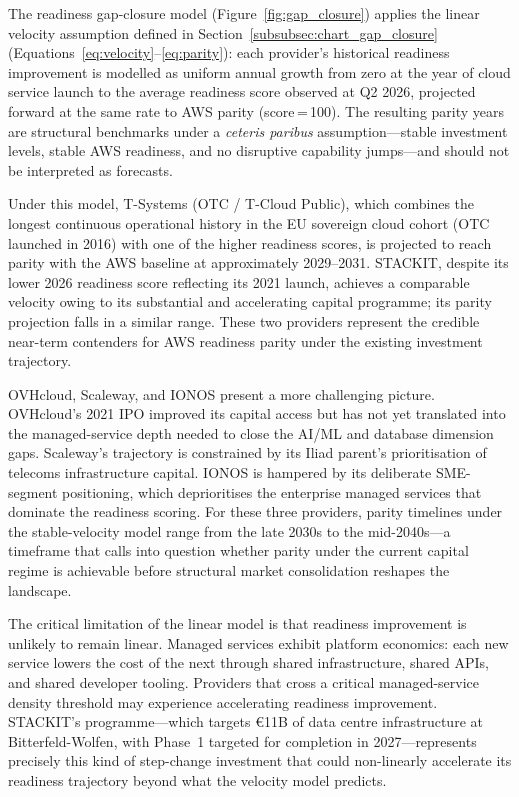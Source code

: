The readiness gap-closure model (Figure~\ref{fig:gap_closure}) applies the linear velocity assumption defined in Section~\ref{subsubsec:chart_gap_closure} (Equations~\ref{eq:velocity}--\ref{eq:parity}): each provider's historical readiness improvement is modelled as uniform annual growth from zero at the year of cloud service launch to the average readiness score observed at Q2 2026, projected forward at the same rate to AWS parity (score\,=\,100). The resulting parity years are structural benchmarks under a \emph{ceteris paribus} assumption---stable investment levels, stable AWS readiness, and no disruptive capability jumps---and should not be interpreted as forecasts.

Under this model, T-Systems (OTC / T-Cloud Public), which combines the longest continuous operational history in the EU sovereign cloud cohort (OTC launched in 2016) with one of the higher readiness scores, is projected to reach parity with the AWS baseline at approximately 2029--2031. STACKIT, despite its lower 2026 readiness score reflecting its 2021 launch, achieves a comparable velocity owing to its substantial and accelerating capital programme; its parity projection falls in a similar range. These two providers represent the credible near-term contenders for AWS readiness parity under the existing investment trajectory.

OVHcloud, Scaleway, and IONOS present a more challenging picture. OVHcloud's 2021 IPO improved its capital access but has not yet translated into the managed-service depth needed to close the AI/ML and database dimension gaps. Scaleway's trajectory is constrained by its Iliad parent's prioritisation of telecoms infrastructure capital. IONOS is hampered by its deliberate SME-segment positioning, which deprioritises the enterprise managed services that dominate the readiness scoring. For these three providers, parity timelines under the stable-velocity model range from the late 2030s to the mid-2040s---a timeframe that calls into question whether parity under the current capital regime is achievable before structural market consolidation reshapes the landscape.

The critical limitation of the linear model is that readiness improvement is unlikely to remain linear. Managed services exhibit platform economics: each new service lowers the cost of the next through shared infrastructure, shared APIs, and shared developer tooling. Providers that cross a critical managed-service density threshold may experience accelerating readiness improvement. STACKIT's programme---which targets €11B of data centre infrastructure at Bitterfeld-Wolfen, with Phase~1 targeted for completion in 2027---represents precisely this kind of step-change investment that could non-linearly accelerate its readiness trajectory beyond what the velocity model predicts.

